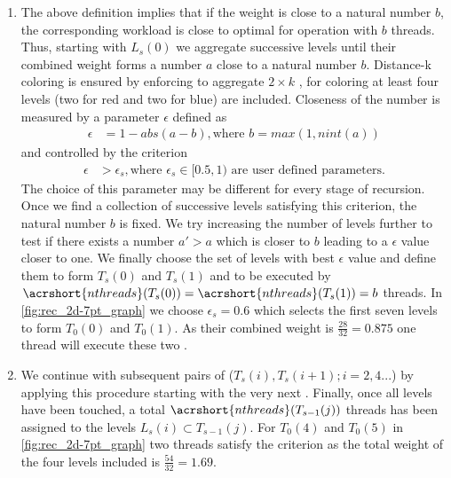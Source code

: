 \begin{enumerate}
	\item The above definition implies that if the weight is close to a natural number $b$, the corresponding workload is close to optimal for operation with $b$ threads. Thus, starting with $L_s(0)$ we aggregate successive levels until their combined weight forms a number $a$ close to a natural number $b$. Distance-k coloring is ensured by enforcing to aggregate \atleast $2 \times k$ \levels, \ie for \DTWO coloring at least four levels (two for red and two for blue) are included. Closeness of the number is measured by a parameter $\epsilon$ defined as
	\begin{align*}
		\epsilon &=  1 - abs(a-b), \text{where } b= max(1,nint(a))
	\end{align*}
	and controlled by the criterion
	\begin{align*}
	\epsilon &> \epsilon_s, \text{where $\epsilon_s \in  [0.5,1)$ are user defined parameters.} 	
	\end{align*}		   
	The choice of this parameter may be different for every stage of recursion. 
	 Once we find a collection of successive levels satisfying this criterion, the natural number $b$ is fixed. We try increasing the number of levels further to test if there exists a number $a'>a$ which is closer to $b$ leading to a $\epsilon$ value closer to one. We finally choose the set of levels with best $\epsilon$ value and define them to form $T_s(0)$ and $T_s(1)$ and to be executed by $\acrshort{nthreads}(T_s(0))=\acrshort{nthreads}(T_s(1))=b$ threads.	 
	 In \cref{fig:rec_2d-7pt_graph} we choose $\epsilon_s = 0.6$ which selects the first seven levels to form $T_0(0)$ and $T_0(1)$.  As their combined weight is $\frac{28}{32}=0.875$  one thread will execute these two \levelGroups. 

	\item We continue with subsequent pairs of \levelGroups ($T_s(i), T_s(i+1); i=2,4 ...$) by applying this procedure starting with the very next \level. Finally, once all levels have been touched, a total $\acrshort{nthreads}(T_{s-1}(j))$ threads has been assigned to the levels $L_s(i) \subset T_{s-1}(j)$. For $T_0(4)$ and $T_0(5)$  in \cref{fig:rec_2d-7pt_graph} two threads satisfy the criterion as the total weight of the four levels included is $\frac{54}{32}=1.69$.
	

\end{enumerate}
